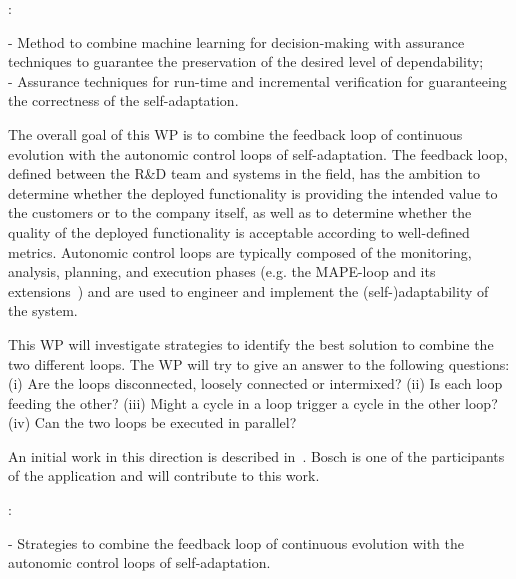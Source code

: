 \documentclass[12pt]{article}
\begin{document}
:
  

 - Method to combine machine learning for decision-making with assurance techniques to guarantee the preservation of the desired level of dependability; \\%
 - Assurance techniques for run-time and incremental verification for guaranteeing the correctness of the self-adaptation.

\vspace{.2cm}

\noindent The overall goal of this WP is to combine the feedback loop of continuous evolution with the autonomic control loops of self-adaptation.
The feedback loop, defined  between the R\&D team and systems in the field, has the ambition to determine whether the
deployed functionality is providing the intended value to the
customers or to the company itself, as well as to determine whether the quality of the deployed functionality is acceptable according to well-defined metrics. 
Autonomic control loops are typically composed of the monitoring, analysis, planning, and execution phases (e.g. the MAPE-loop and its extensions~\cite{MARTAssurance}) and are used to engineer and implement the (self-)adaptability of the system. 

This WP will investigate strategies to identify the best solution to combine the two different loops. The WP will try to give an answer to the following questions:
(i) Are the loops disconnected, loosely connected or intermixed? 
(ii) Is each loop feeding the other?
(iii) Might a cycle in a loop trigger a cycle in the other loop? 
(iv) Can the two loops be executed in parallel?

An initial work in this direction is described in~\cite{Bosch2016}. Bosch is one of the participants of the application and will contribute to this work.

:
 
 - Strategies to combine the feedback loop of continuous evolution with the autonomic control loops of self-adaptation.
\end{document}
